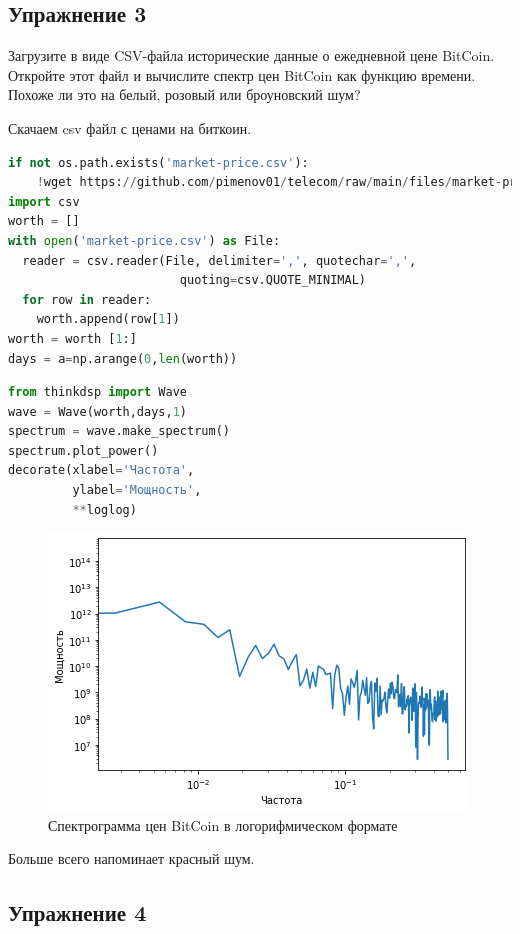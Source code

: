 \subsection{Упражнение 3}

Загрузите в виде CSV-файла исторические данные о ежедневной цене BitCoin. Откройте этот файл и вычислите спектр цен BitCoin как функцию времени. Похоже ли это на белый, розовый или броуновский шум?

Скачаем csv файл с ценами на биткоин.

\begin{lstlisting}[language=Python]
if not os.path.exists('market-price.csv'):
    !wget https://github.com/pimenov01/telecom/raw/main/files/market-price.csv
import csv
worth = []
with open('market-price.csv') as File:
  reader = csv.reader(File, delimiter=',', quotechar=',',
                        quoting=csv.QUOTE_MINIMAL)
  for row in reader:
    worth.append(row[1])
worth = worth [1:]
days = a=np.arange(0,len(worth))
\end{lstlisting}
\begin{lstlisting}[language=Python]
from thinkdsp import Wave
wave = Wave(worth,days,1)
spectrum = wave.make_spectrum()
spectrum.plot_power()
decorate(xlabel='Частота',
         ylabel='Мощность', 
         **loglog)
\end{lstlisting}

\begin{figure}[H]
	\begin{center}
		\includegraphics[scale=1]{fig/lab04/lab4_5.png}
		\caption{Спектрограмма цен BitCoin в логорифмическом формате}
	\end{center}
\end{figure}

Больше всего напоминает красный шум.

\subsection{Упражнение 4}

